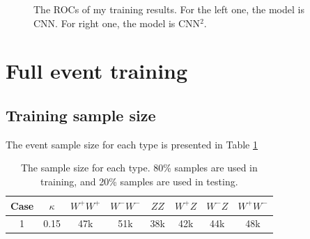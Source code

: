 \documentclass[12pt]{article}
\begin{document}
		\begin{figure}[htpb]
			\centering
			\caption{The ROCs of my training results. For the left one, the model is CNN. For right one, the model is CNN${}^{2}$.}
			\label{fig:ROCs_my}
		\end{figure}

\section{Full event training}%
\label{sec:full_event_training}
	\subsection{Training sample size}%
	\label{sub:full_event_training_sample_size}
		The event sample size for each type is presented in Table \ref{tab:full_event_sample_size}
		\begin{table}[htpb]
			\centering
			\caption{The sample size for each type. 80\% samples are used in training, and 20\% samples are used in testing.}
			\label{tab:full_event_sample_size}
			\begin{tabular}{c|c|c|c|c|c|c|c}
			Case &$\kappa$& $W^+W^+$ & $W^-W^-$ & $ZZ$ & $W^+Z$ & $W^-Z$ & $W^+W^-$ \\ \hline
			1    & 0.15   & 47k      & 51k      & 38k  & 42k    & 44k    & 48k     
			\end{tabular}
		\end{table}
\end{document}
